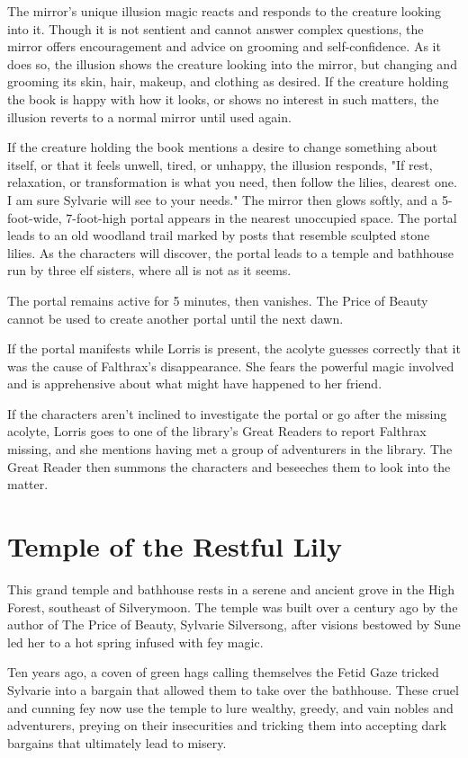 \documentclass[10pt,a4paper,twoside,bg=print,twocolumn,openany,nodeprecatedcode]{dndbook}
\begin{document}
The mirror's unique illusion magic reacts and responds to the creature looking into it. Though it is not sentient and cannot answer complex questions, the mirror offers encouragement and advice on grooming and self-confidence. As it does so, the illusion shows the creature looking into the mirror, but changing and grooming its skin, hair, makeup, and clothing as desired. If the creature holding the book is happy with how it looks, or shows no interest in such matters, the illusion reverts to a normal mirror until used again.

If the creature holding the book mentions a desire to change something about itself, or that it feels unwell, tired, or unhappy, the illusion responds, "If rest, relaxation, or transformation is what you need, then follow the lilies, dearest one. I am sure Sylvarie will see to your needs." The mirror then glows softly, and a 5-foot-wide, 7-foot-high portal appears in the nearest unoccupied space. The portal leads to an old woodland trail marked by posts that resemble sculpted stone lilies. As the characters will discover, the portal leads to a temple and bathhouse run by three elf sisters, where all is not as it seems.

The portal remains active for 5 minutes, then vanishes. The Price of Beauty cannot be used to create another portal until the next dawn.

If the portal manifests while Lorris is present, the acolyte guesses correctly that it was the cause of Falthrax's disappearance. She fears the powerful magic involved and is apprehensive about what might have happened to her friend.

If the characters aren't inclined to investigate the portal or go after the missing acolyte, Lorris goes to one of the library's Great Readers to report Falthrax missing, and she mentions having met a group of adventurers in the library. The Great Reader then summons the characters and beseeches them to look into the matter.

\section{Temple of the Restful Lily}
This grand temple and bathhouse rests in a serene and ancient grove in the High Forest, southeast of Silverymoon. The temple was built over a century ago by the author of The Price of Beauty, Sylvarie Silversong, after visions bestowed by Sune led her to a hot spring infused with fey magic.

Ten years ago, a coven of green hags calling themselves the Fetid Gaze tricked Sylvarie into a bargain that allowed them to take over the bathhouse. These cruel and cunning fey now use the temple to lure wealthy, greedy, and vain nobles and adventurers, preying on their insecurities and tricking them into accepting dark bargains that ultimately lead to misery.
\end{document}
